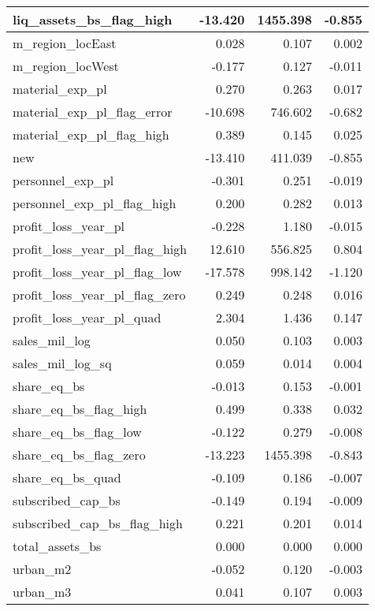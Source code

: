 \begin{table}
\begin{tabular}[t]{l|r|r|r}
\hline
liq\_assets\_bs\_flag\_high & -13.420 & 1455.398 & -0.855\\
\hline
m\_region\_locEast & 0.028 & 0.107 & 0.002\\
\hline
m\_region\_locWest & -0.177 & 0.127 & -0.011\\
\hline
material\_exp\_pl & 0.270 & 0.263 & 0.017\\
\hline
material\_exp\_pl\_flag\_error & -10.698 & 746.602 & -0.682\\
\hline
material\_exp\_pl\_flag\_high & 0.389 & 0.145 & 0.025\\
\hline
new & -13.410 & 411.039 & -0.855\\
\hline
personnel\_exp\_pl & -0.301 & 0.251 & -0.019\\
\hline
personnel\_exp\_pl\_flag\_high & 0.200 & 0.282 & 0.013\\
\hline
profit\_loss\_year\_pl & -0.228 & 1.180 & -0.015\\
\hline
profit\_loss\_year\_pl\_flag\_high & 12.610 & 556.825 & 0.804\\
\hline
profit\_loss\_year\_pl\_flag\_low & -17.578 & 998.142 & -1.120\\
\hline
profit\_loss\_year\_pl\_flag\_zero & 0.249 & 0.248 & 0.016\\
\hline
profit\_loss\_year\_pl\_quad & 2.304 & 1.436 & 0.147\\
\hline
sales\_mil\_log & 0.050 & 0.103 & 0.003\\
\hline
sales\_mil\_log\_sq & 0.059 & 0.014 & 0.004\\
\hline
share\_eq\_bs & -0.013 & 0.153 & -0.001\\
\hline
share\_eq\_bs\_flag\_high & 0.499 & 0.338 & 0.032\\
\hline
share\_eq\_bs\_flag\_low & -0.122 & 0.279 & -0.008\\
\hline
share\_eq\_bs\_flag\_zero & -13.223 & 1455.398 & -0.843\\
\hline
share\_eq\_bs\_quad & -0.109 & 0.186 & -0.007\\
\hline
subscribed\_cap\_bs & -0.149 & 0.194 & -0.009\\
\hline
subscribed\_cap\_bs\_flag\_high & 0.221 & 0.201 & 0.014\\
\hline
total\_assets\_bs & 0.000 & 0.000 & 0.000\\
\hline
urban\_m2 & -0.052 & 0.120 & -0.003\\
\hline
urban\_m3 & 0.041 & 0.107 & 0.003\\
\hline
\end{tabular}
\end{table}